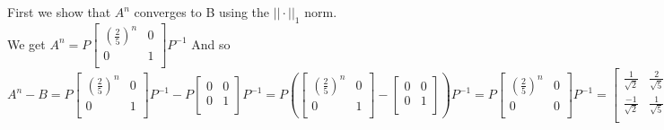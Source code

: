 \documentclass[letterpaper,12pt]{article}
\theoremstyle{definition}
\begin{document}
  First we show that $A^n$ converges to B using the $||\cdot ||_1$ norm.\\
  
 We get $A^n = P\begin{bmatrix}
   (\frac{2}{5})^n  & 0\\
   0  &  1 \\
  \end{bmatrix} P^{-1}$
  And so $A^n-B = P\begin{bmatrix}
   (\frac{2}{5})^n  & 0\\
   0  &  1 \\
  \end{bmatrix} P^{-1} - P\begin{bmatrix}
   0  & 0\\
   0  &  1 \\
  \end{bmatrix} P^{-1} = 
  P\left(  \begin{bmatrix}
   (\frac{2}{5})^n  & 0\\
   0  &  1 \\
  \end{bmatrix} -
  \begin{bmatrix}
   0  & 0\\
   0  &  1 \\
  \end{bmatrix}\right)P^{-1} = 
  P\begin{bmatrix}
   (\frac{2}{5})^n  & 0\\
   0  &  0 \\
  \end{bmatrix} P^{-1} = 
  \begin{bmatrix}
   \frac{1}{\sqrt{2}}  &  \frac{2}{\sqrt{5}} \\
   \frac{-1}{\sqrt{2}}  &  \frac{1}{\sqrt{5}} \\
  \end{bmatrix} 
  \begin{bmatrix}
   (\frac{2}{5})^n  & 0\\
   0  &  0 \\
  \end{bmatrix}
  \begin{bmatrix}
   \frac{\sqrt{2}}{3}  &  \frac{-2\sqrt{2}}{3} \\
   \frac{\sqrt{5}}{3}  &  \frac{\sqrt{5}}{3} \\
  \end{bmatrix}$\\
  
\end{document}
